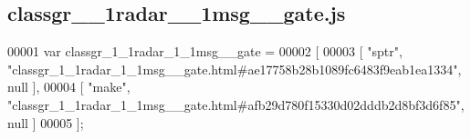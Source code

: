 \subsection{classgr\+\_\+\_\+1radar\+\_\+\_\+1msg\+\_\+\+\_\+gate.\+js}
\label{classgr__1__1radar__1__1msg____gate_8js_source}

\begin{DoxyCode}
00001 var classgr_1_1radar_1_1msg__gate =
00002 [
00003     [ \textcolor{stringliteral}{"sptr"}, \textcolor{stringliteral}{"classgr\_1\_1radar\_1\_1msg\_\_gate.html#ae17758b28b1089fc6483f9eab1ea1334"}, null ],
00004     [ \textcolor{stringliteral}{"make"}, \textcolor{stringliteral}{"classgr\_1\_1radar\_1\_1msg\_\_gate.html#afb29d780f15330d02dddb2d8bf3d6f85"}, null ]
00005 ];
\end{DoxyCode}
